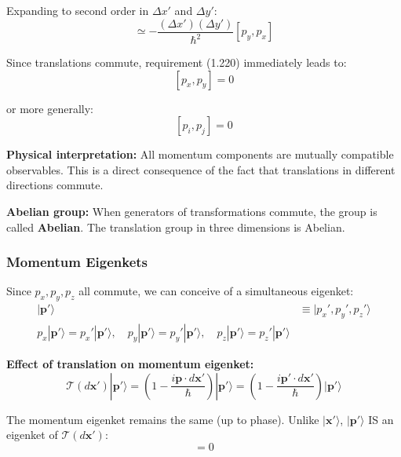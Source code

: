 \documentclass[11pt,a4paper]{article}
\begin{document}
Expanding to second order in $\Delta x'$ and $\Delta y'$:
\begin{equation}
[\mathcal{T}(\Delta y'\hat{\mathbf{y}}), \mathcal{T}(\Delta x'\hat{\mathbf{x}})] \simeq -\frac{(\Delta x')(\Delta y')}{\hbar^2}[p_y, p_x]
\tag{1.221}
\end{equation}

Since translations commute, requirement (1.220) immediately leads to:
\begin{equation}
\boxed{[p_x, p_y] = 0}
\tag{1.223}
\end{equation}

or more generally:
\begin{equation}
\boxed{[p_i, p_j] = 0}
\tag{1.224}
\end{equation}

\textbf{Physical interpretation:} All momentum components are mutually compatible observables. This is a direct consequence of the fact that translations in different directions commute.

\textbf{Abelian group:} When generators of transformations commute, the group is called \textbf{Abelian}. The translation group in three dimensions is Abelian.

\subsubsection{Momentum Eigenkets}

Since $p_x, p_y, p_z$ all commute, we can conceive of a simultaneous eigenket:
\begin{align}
|\mathbf{p}'\rangle &\equiv |p_x', p_y', p_z'\rangle \tag{1.225a} \\
p_x|\mathbf{p}'\rangle = p_x'|\mathbf{p}'\rangle, \quad p_y|\mathbf{p}'\rangle = p_y'|\mathbf{p}'\rangle, \quad p_z|\mathbf{p}'\rangle = p_z'|\mathbf{p}'\rangle \tag{1.225b}
\end{align}

\textbf{Effect of translation on momentum eigenket:}
\begin{equation}
\mathcal{T}(d\mathbf{x}')|\mathbf{p}'\rangle = \left(1 - \frac{i\mathbf{p} \cdot d\mathbf{x}'}{\hbar}\right)|\mathbf{p}'\rangle = \left(1 - \frac{i\mathbf{p}' \cdot d\mathbf{x}'}{\hbar}\right)|\mathbf{p}'\rangle
\tag{1.226}
\end{equation}

The momentum eigenket remains the same (up to phase). Unlike $|\mathbf{x}'\rangle$, $|\mathbf{p}'\rangle$ IS an eigenket of $\mathcal{T}(d\mathbf{x}')$:
\begin{equation}
[\mathbf{p}, \mathcal{T}(d\mathbf{x}')] = 0
\tag{1.227}
\end{equation}
\end{document}
